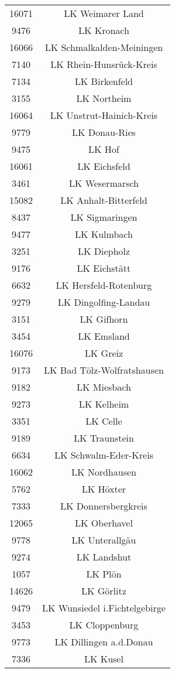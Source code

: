 \begin{tabular}{c c}
    16071&LK Weimarer Land\\ 
    9476&LK Kronach\\ 
    16066&LK Schmalkalden-Meiningen\\ 
    7140&LK Rhein-Hunsrück-Kreis\\ 
    7134&LK Birkenfeld\\ 
    3155&LK Northeim\\ 
    16064&LK Unstrut-Hainich-Kreis\\ 
    9779&LK Donau-Ries\\ 
    9475&LK Hof\\ 
    16061&LK Eichsfeld\\ 
    3461&LK Wesermarsch\\ 
    15082&LK Anhalt-Bitterfeld\\ 
    8437&LK Sigmaringen\\ 
    9477&LK Kulmbach\\ 
    3251&LK Diepholz\\ 
    9176&LK Eichstätt\\ 
    6632&LK Hersfeld-Rotenburg\\ 
    9279&LK Dingolfing-Landau\\ 
    3151&LK Gifhorn\\ 
    3454&LK Emsland\\ 
    16076&LK Greiz\\ 
    9173&LK Bad Tölz-Wolfratshausen\\ 
    9182&LK Miesbach\\ 
    9273&LK Kelheim\\ 
    3351&LK Celle\\ 
    9189&LK Traunstein\\ 
    6634&LK Schwalm-Eder-Kreis\\ 
    16062&LK Nordhausen\\ 
    5762&LK Höxter\\ 
    7333&LK Donnersbergkreis\\ 
    12065&LK Oberhavel\\ 
    9778&LK Unterallgäu\\ 
    9274&LK Landshut\\ 
    1057&LK Plön\\ 
    14626&LK Görlitz\\ 
    9479&LK Wunsiedel i.Fichtelgebirge\\ 
    3453&LK Cloppenburg\\ 
    9773&LK Dillingen a.d.Donau\\ 
    7336&LK Kusel\\ 

\end{tabular}
